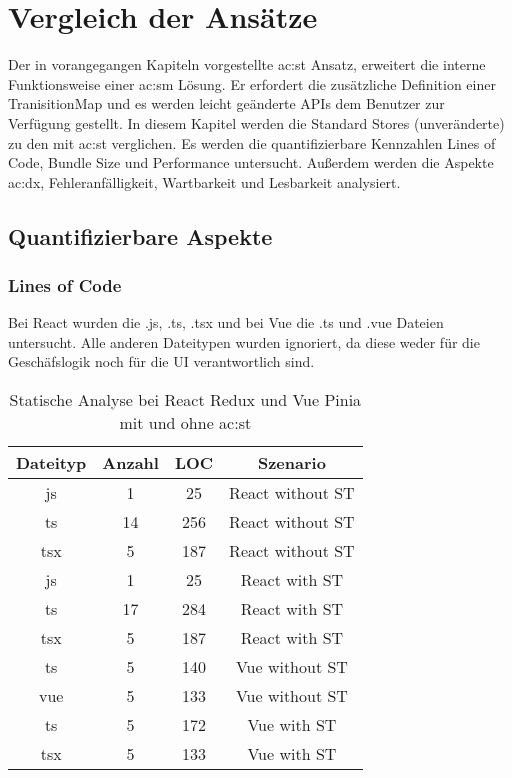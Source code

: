 \chapter{Vergleich der Ansätze} \label{vergleich}

Der in vorangegangen Kapiteln vorgestellte \acrlong{ac:st} Ansatz, erweitert die interne Funktionsweise einer \acrlong{ac:sm} Lösung. Er erfordert die zusätzliche Definition einer TranisitionMap und es werden leicht geänderte APIs dem Benutzer zur Verfügung gestellt. In diesem Kapitel werden die Standard Stores (unveränderte) zu den mit \acrlong{ac:st} verglichen. Es werden die quantifizierbare Kennzahlen Lines of Code, Bundle Size und Performance untersucht. Außerdem werden die Aspekte \acrlong{ac:dx}, Fehleranfälligkeit, Wartbarkeit und Lesbarkeit analysiert.

\section{Quantifizierbare Aspekte}
\subsection{Lines of Code}

Bei React wurden die .js, .ts, .tsx und bei Vue die .ts und .vue Dateien untersucht. Alle anderen Dateitypen wurden ignoriert, da diese weder für die Geschäfslogik noch für die UI verantwortlich sind.

\begin{table}[h!]
  \caption{Statische Analyse bei React Redux und Vue Pinia mit und ohne \acrshort{ac:st}}
  \label{tab:staticAnalysisSTvsNoST}

  \begin{center}
    \begin{tabular}{|c|c|c|c|} 
    \hline
    Dateityp & Anzahl & LOC & Szenario \\ [0.5ex] 
    \hline\hline
    js & 1 & 25 & React without ST \\ 
    \hline
    ts & 14 & 256 & React without ST \\
    \hline
    tsx & 5 & 187 & React without ST \\
    \hline\hline
    js & 1 & 25 & React with ST \\ 
    \hline
    ts & 17 & 284 & React with ST \\
    \hline
    tsx & 5 & 187 & React with ST \\
    \hline\hline
    ts & 5 & 140 & Vue without ST \\
    \hline
    vue & 5 & 133 & Vue without ST \\
    \hline\hline
    ts & 5 & 172 & Vue with ST \\
    \hline
    tsx & 5 & 133 & Vue with ST \\
    \hline
    \end{tabular}
  \end{center}
\end{table}

